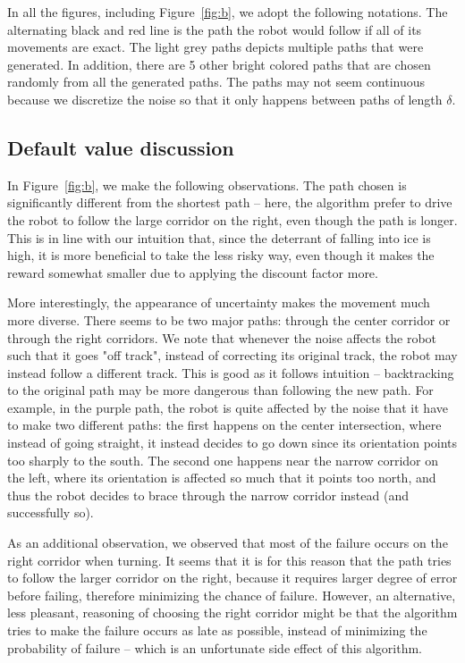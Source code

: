 \documentclass[10pt,a4paper,oneside]{article}
\begin{document}
In all the figures, including Figure~\ref{fig:b}, we adopt the following notations.
The alternating black and red line is the path the robot would follow if
all of its movements are exact. The light grey paths depicts multiple paths
that were generated. In addition, there are 5 other bright colored paths that
are chosen randomly from all the generated paths. The paths may not seem continuous
because we discretize the noise so that it only happens between paths of length
$\delta$.

\subsection{Default value discussion}
In Figure~\ref{fig:b}, we make the following observations. The path chosen is
significantly different from the shortest path -- here, the algorithm prefer
to drive the robot to follow the large corridor on the right, even though
the path is longer. This is in line with our intuition that, since the deterrant
of falling into ice is high, it is more beneficial to take the less risky way,
even though it makes the reward somewhat smaller due to applying the discount
factor more.

More interestingly, the appearance of uncertainty makes the movement much more
diverse. There seems to be two major paths: through the center corridor or
through the right corridors. We note that whenever the noise affects the robot
such that it goes "off track", instead of correcting its original track, the
robot may instead follow a different track. This is good as it follows
intuition -- backtracking to the original path may be more dangerous
than following the new path. For example, in the purple path, the robot is
quite affected by the noise that it have to make two different paths: the first
happens on the center intersection, where instead of going straight, it instead
decides to go down since its orientation points too sharply to the south. The
second one happens near the narrow corridor on the left, where its orientation
is affected so much that it points too north, and thus the robot decides to
brace through the narrow corridor instead (and successfully so).

As an additional observation, we observed that most of the failure occurs on the
right corridor when turning. It seems that it is for this reason that the path
tries to follow the larger corridor on the right, because it requires larger degree
of error before failing, therefore minimizing the chance of failure. However,
an alternative, less pleasant, reasoning of choosing the right corridor might
be that the algorithm tries to make the failure occurs as late as possible,
instead of minimizing the probability of failure -- which is an unfortunate side
effect of this algorithm.
\end{document}
